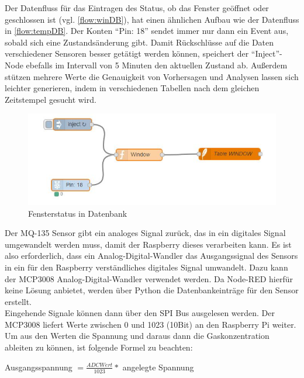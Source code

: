 Der Datenfluss für das Eintragen des Status, ob das Fenster geöffnet oder geschlossen ist (vgl. \autoref{flow:winDB}), hat einen ähnlichen Aufbau wie der Datenfluss in \autoref{flow:tempDB}. Der Konten \enquote{Pin: 18} sendet immer nur dann ein Event aus, sobald sich eine Zustandsänderung gibt. Damit Rückschlüsse auf die Daten verschiedener Sensoren besser getätigt werden können, speichert der \enquote{Inject}-Node ebefalls im Intervall von 5 Minuten den aktuellen Zustand ab. 
Außerdem stützen mehrere Werte die Genauigkeit von Vorhersagen und Analysen lassen sich leichter generieren, indem in verschiedenen Tabellen nach dem gleichen Zeitstempel gesucht wird.
\begin{figure}[h]
	\centering
	\includegraphics[scale=0.7]{images/windowIntoDB}
	\caption{Fensterstatus in Datenbank}
	\label{flow:winDB}
\end{figure}

Der MQ-135 Sensor gibt ein analoges Signal zurück, das in ein digitales Signal umgewandelt werden muss, damit der Raspberry dieses verarbeiten kann. Es ist also erforderlich, dass ein Analog-Digital-Wandler das Ausgangssignal des Sensors in ein für den Raspberry verständliches digitales Signal umwandelt. Dazu kann der MCP3008 Analog-Digital-Wandler verwendet werden. Da Node-RED hierfür keine Lösung anbietet, werden über Python die Datenbankeinträge für den Sensor erstellt.
\\Eingehende Signale können dann über den \acf{SPI} Bus ausgelesen werden. Der MCP3008 liefert Werte zwischen 0 und 1023 (10Bit) an den Raspberry Pi weiter. Um aus den Werten die Spannung und daraus dann die Gaskonzentration ableiten zu können, ist folgende Formel zu beachten\cite{gas:MQX}:\\
\begin{center} Ausgangsspannung $=  \frac{ADC Wert}{1023} *  $ angelegte Spannung\end{center}

